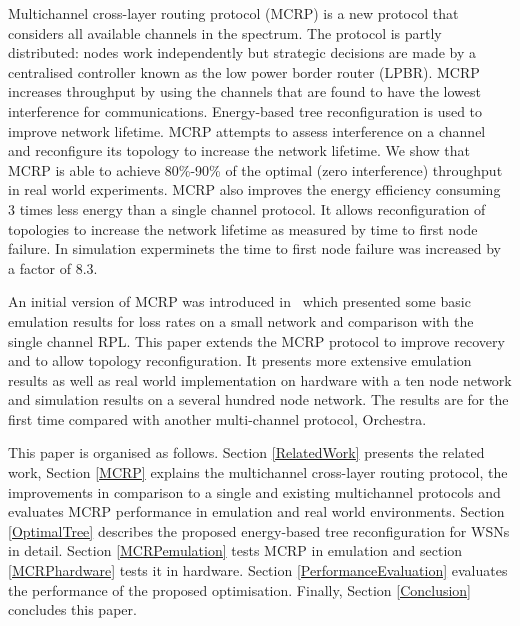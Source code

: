 Multichannel cross-layer routing protocol (MCRP) is a new protocol that considers all available channels in the spectrum. The protocol is partly distributed: nodes work independently but strategic decisions are made by a centralised controller known as the low power border router (LPBR). MCRP increases throughput by using the channels that are found to have the lowest interference for communications.
Energy-based tree reconfiguration is used to improve network lifetime.  MCRP attempts to assess interference on a channel and reconfigure its topology to increase the network lifetime.
We show that MCRP is able to achieve 80\%-90\% of the optimal (zero interference) throughput in real world experiments.
MCRP also improves the energy efficiency consuming 3 times less energy than a single channel protocol.  It allows reconfiguration of topologies to increase the network lifetime as measured by time to first node failure.  In simulation experminets the time to first node failure was increased by a factor of 8.3.

An initial version of MCRP was introduced in~\cite{mcrp} which presented some basic emulation results for loss rates on a small network and comparison with the single channel RPL.  This paper extends the MCRP protocol to improve recovery and to allow topology reconfiguration.  It presents more extensive emulation results as well as real world implementation on hardware with a ten node network and simulation results on a several hundred node network.  The results are for the first time compared with another multi-channel protocol, Orchestra.

This paper is organised as follows. Section \ref{RelatedWork} presents the related work, Section \ref{MCRP} explains the multichannel cross-layer routing protocol, the improvements in comparison to a single and existing multichannel protocols and evaluates MCRP performance in emulation and real world environments.
Section \ref{OptimalTree} describes the proposed energy-based tree reconfiguration for WSNs in detail.  Section \ref{MCRPemulation} tests MCRP in emulation and section \ref{MCRPhardware} tests it in hardware.
Section \ref{PerformanceEvaluation} evaluates the performance of the proposed optimisation. Finally, Section \ref{Conclusion} concludes this paper.

